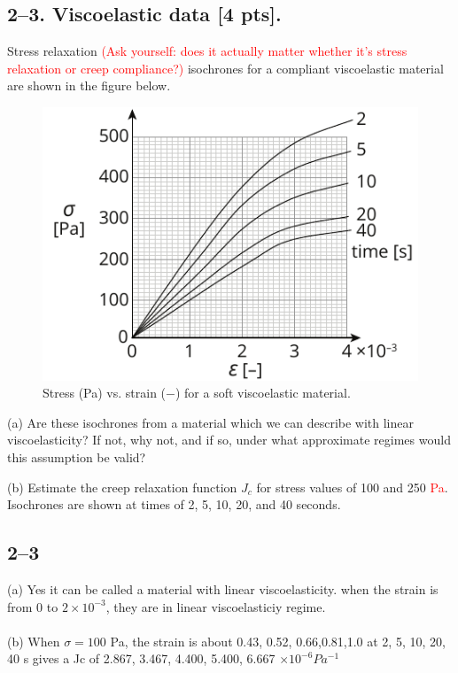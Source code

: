 \bigskip
\subsection*{2--3. \textbf{Viscoelastic data} [4 pts].} 
Stress relaxation \textcolor{red}{(Ask yourself: does it actually matter whether it's stress relaxation or creep compliance?)} isochrones for a compliant viscoelastic material are shown in the figure below.  

\begin{figure}[H]
\vspace{-1em}
\centering
\includegraphics[scale = 1.5]{instr-figures/PS2-Q3.pdf}
\caption{\small{Stress (Pa) vs. strain ($-$) for a soft viscoelastic material.}}
\end{figure}

\vspace{-1em}
(a) Are these isochrones from a material which we can describe with linear viscoelasticity? If not, why not, and if so, under what approximate regimes would this assumption be valid? 

\medskip
(b) Estimate the creep relaxation function $J_c$ for stress values of 100 and 250 \textcolor{red}{Pa}. Isochrones are shown at times of 2, 5, 10, 20, and 40 seconds.   

\subsection*{2--3}
(a) Yes it can be called a material with linear viscoelasticity. when the strain is from 0 to $2 \times 10^{-3}$, they are in linear viscoelasticiy regime. \\
\\
(b) When $\sigma = 100$ Pa, the strain is about 0.43, 0.52, 0.66,0.81,1.0  at 2, 5, 10, 20, 40 s  gives a Jc of 2.867, 3.467, 4.400, 5.400, 6.667 $\times10^{-6} Pa^{-1}$

